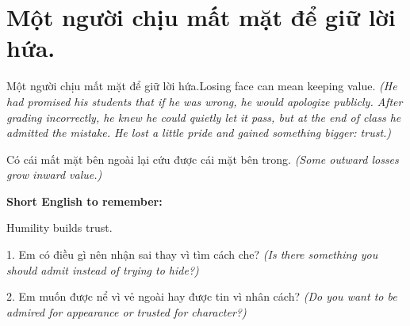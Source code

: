 \section{Một người chịu mất mặt để giữ lời hứa.}
\begin{truyen}{Một người chịu mất mặt để giữ lời hứa.}{Losing face can mean keeping value.}
\textit{(He had promised his students that if he was wrong, he would apologize publicly. After grading incorrectly, he knew he could quietly let it pass, but at the end of class he admitted the mistake. He lost a little pride and gained something bigger: trust.)}
\end{truyen}
\begin{baihoc}
Có cái mất mặt bên ngoài lại cứu được cái mặt bên trong.
\textit{(Some outward losses grow inward value.)}
\end{baihoc}
\begin{ghinhoanh}
\textbf{Short English to remember:}

Humility builds trust.
\end{ghinhoanh}
\begin{tuhocnhanh}
1. Em có điều gì nên nhận sai thay vì tìm cách che? \textit{(Is there something you should admit instead of trying to hide?)}

2. Em muốn được nể vì vẻ ngoài hay được tin vì nhân cách? \textit{(Do you want to be admired for appearance or trusted for character?)}
\end{tuhocnhanh}
\ngancach
